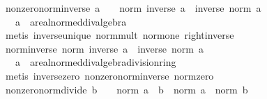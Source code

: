 \begin{isabellebody}
\endisatagproof
{\isafoldproof}%
%
\isadelimproof
\isanewline
%
\endisadelimproof
\isanewline
{}\isamarkupfalse%
\ nonzero{\isacharunderscore}{\kern0pt}norm{\isacharunderscore}{\kern0pt}inverse{\isacharcolon}{\kern0pt}\ {\isachardoublequoteopen}a\ {\isasymnoteq}\ {}\ {\isasymLongrightarrow}\ norm\ {\isacharparenleft}{\kern0pt}inverse\ a{\isacharparenright}{\kern0pt}\ {\isacharequal}{\kern0pt}\ inverse\ {\isacharparenleft}{\kern0pt}norm\ a{\isacharparenright}{\kern0pt}{\isachardoublequoteclose}\isanewline
\ \ \ a\ {\isacharcolon}{\kern0pt}{\isacharcolon}{\kern0pt}\ {\isachardoublequoteopen}{\isacharprime}{\kern0pt}a{\isacharcolon}{\kern0pt}{\isacharcolon}{\kern0pt}real{\isacharunderscore}{\kern0pt}normed{\isacharunderscore}{\kern0pt}div{\isacharunderscore}{\kern0pt}algebra{\isachardoublequoteclose}\isanewline
%
\isadelimproof
\ \ %
\endisadelimproof
%
\isatagproof
{}\isamarkupfalse%
\ {\isacharparenleft}{\kern0pt}metis\ inverse{\isacharunderscore}{\kern0pt}unique\ norm{\isacharunderscore}{\kern0pt}mult\ norm{\isacharunderscore}{\kern0pt}one\ right{\isacharunderscore}{\kern0pt}inverse{\isacharparenright}{\kern0pt}%
\endisatagproof
{\isafoldproof}%
%
\isadelimproof
\isanewline
%
\endisadelimproof
\isanewline
{}\isamarkupfalse%
\ norm{\isacharunderscore}{\kern0pt}inverse{\isacharcolon}{\kern0pt}\ {\isachardoublequoteopen}norm\ {\isacharparenleft}{\kern0pt}inverse\ a{\isacharparenright}{\kern0pt}\ {\isacharequal}{\kern0pt}\ inverse\ {\isacharparenleft}{\kern0pt}norm\ a{\isacharparenright}{\kern0pt}{\isachardoublequoteclose}\isanewline
\ \ \ a\ {\isacharcolon}{\kern0pt}{\isacharcolon}{\kern0pt}\ {\isachardoublequoteopen}{\isacharprime}{\kern0pt}a{\isacharcolon}{\kern0pt}{\isacharcolon}{\kern0pt}{\isacharbraceleft}{\kern0pt}real{\isacharunderscore}{\kern0pt}normed{\isacharunderscore}{\kern0pt}div{\isacharunderscore}{\kern0pt}algebra{\isacharcomma}{\kern0pt}division{\isacharunderscore}{\kern0pt}ring{\isacharbraceright}{\kern0pt}{\isachardoublequoteclose}\isanewline
%
\isadelimproof
\ \ %
\endisadelimproof
%
\isatagproof
{}\isamarkupfalse%
\ {\isacharparenleft}{\kern0pt}metis\ inverse{\isacharunderscore}{\kern0pt}zero\ nonzero{\isacharunderscore}{\kern0pt}norm{\isacharunderscore}{\kern0pt}inverse\ norm{\isacharunderscore}{\kern0pt}zero{\isacharparenright}{\kern0pt}%
\endisatagproof
{\isafoldproof}%
%
\isadelimproof
\isanewline
%
\endisadelimproof
\isanewline
{}\isamarkupfalse%
\ nonzero{\isacharunderscore}{\kern0pt}norm{\isacharunderscore}{\kern0pt}divide{\isacharcolon}{\kern0pt}\ {\isachardoublequoteopen}b\ {\isasymnoteq}\ {}\ {\isasymLongrightarrow}\ norm\ {\isacharparenleft}{\kern0pt}a\ {\isacharslash}{\kern0pt}\ b{\isacharparenright}{\kern0pt}\ {\isacharequal}{\kern0pt}\ norm\ a\ {\isacharslash}{\kern0pt}\ norm\ b{\isachardoublequoteclose}\isanewline

\end{isabellebody}
